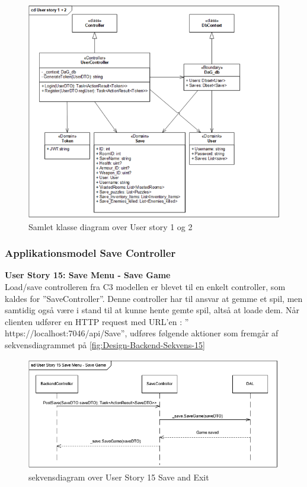 \begin{figure}[H]
\centering
\includegraphics[width = \textwidth]{02-Body/Images/Backend_klasse_1_2.PNG}
\caption{Samlet klasse diagram over User story 1 og 2}
\label{fig:Design-Backend-Klasse-1-2}
\end{figure}

\subsubsection{Applikationsmodel Save Controller}
\textbf{User Story 15: Save Menu - Save Game}\\
Load/save controlleren fra C3 modellen er blevet til en enkelt controller, som kaldes for ”SaveController”. Denne controller har til ansvar at gemme et spil, men samtidig også være i stand til at kunne hente gemte spil, altså at loade dem.
Når clienten udfører en HTTP request med URL’en : ” https://localhost:7046/api/Save”, udføres følgende aktioner som fremgår af sekvensdiagrammet på \autoref{fig:Design-Backend-Sekvens-15}\\

\begin{figure}[H]
\centering
\includegraphics[width = \textwidth]{02-Body/Images/Backend_sekvens_15.PNG}
\caption{sekvensdiagram over User Story 15 Save and Exit}
\label{fig:Design-Backend-Sekvens-15}
\end{figure}


